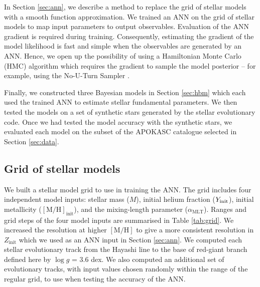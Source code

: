 \documentclass[a4paper,fleqn,usenatbib]{mnras}
\newcommand{\metallicity}{\ensuremath{[\mathrm{M}/\mathrm{H}]}}
\newcommand{\mlt}{\ensuremath{{\alpha_\mathrm{MLT}}}}
\begin{document}
In Section \ref{sec:ann}, we describe a method to replace the grid of stellar models with a smooth function approximation. We trained an ANN on the grid of stellar models to map input parameters to output observables. Evaluation of the ANN gradient is required during training. Consequently, estimating the gradient of the model likelihood is fast and simple when the observables are generated by an ANN. Hence, we open up the possibility of using a Hamiltonian Monte Carlo (HMC) algorithm which requires the gradient to sample the model posterior -- for example, using the No-U-Turn Sampler \citep[NUTS;][]{Hoffman.Gelman2014}.

Finally, we constructed three Bayesian models in Section \ref{sec:hbm} which each used the trained ANN to estimate stellar fundamental parameters. We then tested the models on a set of synthetic stars generated by the stellar evolutionary code. Once we had tested the model accuracy with the synthetic stars, we evaluated each model on the subset of the APOKASC catalogue selected in Section \ref{sec:data}.

\subsection{Grid of stellar models}\label{sec:grid}

We built a stellar model grid to use in training the ANN. The grid includes four independent model inputs: stellar mass ($M$), initial helium fraction ($Y_{\rm init}$), initial metallicity ($\mathrm{[M/H]}_\mathrm{init}$), and the mixing-length parameter ($\mlt$). Ranges and grid steps of the four model inputs are summarised in Table \ref{tab:grid}. We increased the resolution at higher $\metallicity$ to give a more consistent resolution in $Z_\mathrm{init}$ which we used as an ANN input in Section \ref{sec:ann}. We computed each stellar evolutionary track from the Hayashi line to the base of red-giant branch defined here by $\log g$ = 3.6 dex. 
We also computed an additional set of evolutionary tracks, with input values chosen randomly within the range of the regular grid, to use when testing the accuracy of the ANN.
\end{document}

